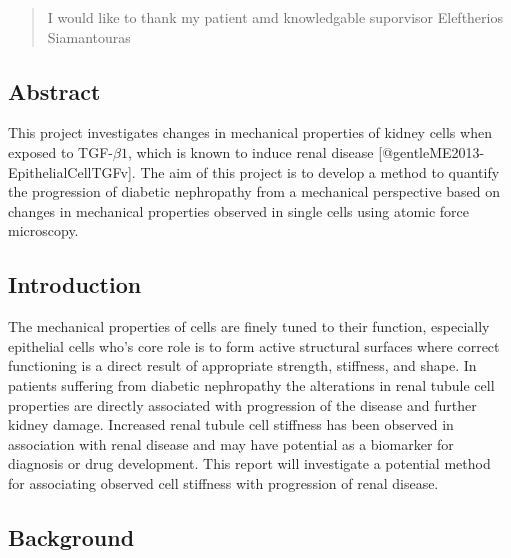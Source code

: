 \documentclass[
  paper=a4,
  ,captions=tableheading
]{scrartcl}
\begin{document}
\begin{abstract}
\begin{justify}
I would like to thank my patient amd knowledgable suporvisor Eleftherios
Siamantouras
\end{justify}
\end{abstract}
\pagebreak


\setcounter{page}{0} %



\renewcommand*\contentsname{}
\renewcommand*\contentsname{Table of Contents}
{
\setcounter{tocdepth}{3}
\tableofcontents
\newpage
}
\subsection{Abstract}\label{abstract}

This project investigates changes in mechanical properties of kidney
cells when exposed to TGF-\(\beta 1\), which is known to induce renal
disease {[}@gentleME2013-EpithelialCellTGFv{]}. The aim of this project
is to develop a method to quantify the progression of diabetic
nephropathy from a mechanical perspective based on changes in mechanical
properties observed in single cells using atomic force microscopy.

\subsection{Introduction}\label{introduction}

The mechanical properties of cells are finely tuned to their function,
especially epithelial cells who's core role is to form active structural
surfaces where correct functioning is a direct result of appropriate
strength, stiffness, and shape. In patients suffering from diabetic
nephropathy the alterations in renal tubule cell properties are directly
associated with progression of the disease and further kidney damage.
Increased renal tubule cell stiffness has been observed in association
with renal disease and may have potential as a biomarker for diagnosis
or drug development. This report will investigate a potential method for
associating observed cell stiffness with progression of renal disease.

\subsection{Background}\label{background}
\end{document}
